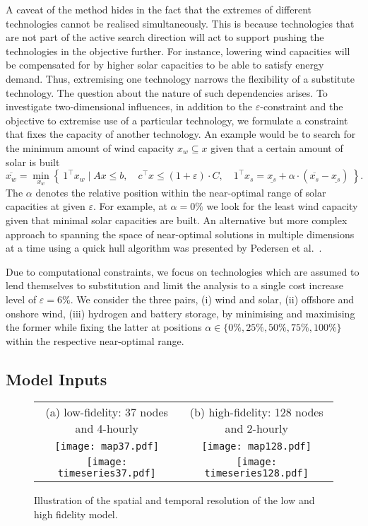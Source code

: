 A caveat of the method hides in the fact that the extremes
of different technologies cannot be realised simultaneously.
This is because technologies that are not part of the active search direction
will act to support pushing the technologies in the objective further.
For instance, lowering wind capacities will be compensated for
by higher solar capacities to be able to satisfy energy demand.
Thus, extremising one technology narrows the flexibility of a substitute technology. The question about the nature of such dependencies arises.
To investigate two-dimensional influences,
in addition to the $\varepsilon$-constraint and the objective to
extremise use of a particular technology,
we formulate a constraint that fixes the capacity of another technology.
An example would be to search for the minimum amount of wind capacity $x_w \subseteq x$ 
given that a certain amount of solar is built
\begin{equation}
    \overline{x_w} = \min_{x_w}\left\{\:1^\top x_w \mid Ax\leq b,\quad c^\top x\leq (1+\varepsilon)\cdot C, \quad 1^\top x_s = \underline{x_s} + \alpha \cdot (\overline{x_s}-\underline{x_s}) \:\right\}.
\end{equation}
The $\alpha$ denotes the relative position within the near-optimal
range of solar capacities at given $\varepsilon$.
For example, at $\alpha=0\%$ we look for the least wind capacity
given that minimal solar capacities are built. 
An alternative but more complex approach to spanning the space of near-optimal solutions in multiple dimensions at a time
using a quick hull algorithm was presented by Pedersen et al.~\cite{pedersen_modeling_2020}.

Due to computational constraints, we focus on technologies which
are assumed to lend themselves to substitution and limit the analysis to a single
cost increase level of $\varepsilon=6\%$.
We consider the three pairs,
(i) wind and solar,
(ii) offshore and onshore wind,
(iii) hydrogen and battery storage,
by minimising and maximising the former while
fixing the latter at positions $\alpha \in \{0\%,25\%,50\%,75\%,100\%\}$
within the respective near-optimal range.

\subsection{Model Inputs}

\begin{SCfigure}
    \begin{tabular}{cc}
        \footnotesize (a) low-fidelity: 37 nodes and 4-hourly & \footnotesize (b) high-fidelity: 128 nodes and 2-hourly \\
        \texttt{[image: map37.pdf]} &
        \texttt{[image: map128.pdf]} \\
        \texttt{[image: timeseries37.pdf]} &
        \texttt{[image: timeseries128.pdf]} \\
    \end{tabular}
    \caption{Illustration of the spatial and temporal resolution of the low and high fidelity model.}
    \label{fig:pypsaeur}
\end{SCfigure}

